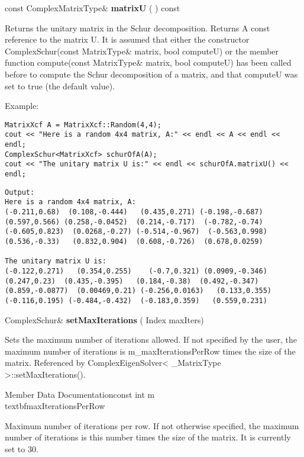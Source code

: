 \vspace{0.3cm}					
const ComplexMatrixType\& \textbf{matrixU}  ( )  const 

Returns the unitary matrix in the Schur decomposition. 
Returns
A const reference to the matrix U.
It is assumed that either the constructor ComplexSchur(const MatrixType\& matrix, bool computeU) or the member function compute(const MatrixType\& matrix, bool computeU) has been called before to compute the Schur decomposition of a matrix, and that computeU was set to true (the default value).


Example:
\begin{lstlisting}
MatrixXcf A = MatrixXcf::Random(4,4);
cout << "Here is a random 4x4 matrix, A:" << endl << A << endl << endl;
ComplexSchur<MatrixXcf> schurOfA(A);
cout << "The unitary matrix U is:" << endl << schurOfA.matrixU() << endl;
\end{lstlisting}

\begin{verbatim}
Output:
Here is a random 4x4 matrix, A:
(-0.211,0.68)  (0.108,-0.444)   (0.435,0.271) (-0.198,-0.687)
(0.597,0.566) (0.258,-0.0452)  (0.214,-0.717)  (-0.782,-0.74)
(-0.605,0.823)  (0.0268,-0.27) (-0.514,-0.967)  (-0.563,0.998)
(0.536,-0.33)   (0.832,0.904)  (0.608,-0.726)  (0.678,0.0259)

The unitary matrix U is:
(-0.122,0.271)   (0.354,0.255)    (-0.7,0.321) (0.0909,-0.346)
(0.247,0.23)  (0.435,-0.395)   (0.184,-0.38)  (0.492,-0.347)
(0.859,-0.0877)  (0.00469,0.21) (-0.256,0.0163)   (0.133,0.355)
(-0.116,0.195) (-0.484,-0.432)  (-0.183,0.359)   (0.559,0.231)
\end{verbatim}


\vspace{0.3cm}
ComplexSchur\& \textbf{setMaxIterations}  ( Index  maxIters)   

Sets the maximum number of iterations allowed. 
If not specified by the user, the maximum number of iterations is m\_maxIterationsPerRow times the size of the matrix. 
Referenced by ComplexEigenSolver< \_MatrixType >::setMaxIterations().


\vspace{0.3cm}
Member Data Documentationconst int m\\textbf{maxIterationsPerRow} 

Maximum number of iterations per row. 
If not otherwise specified, the maximum number of iterations is this number times the size of the matrix. It is currently set to 30. 



